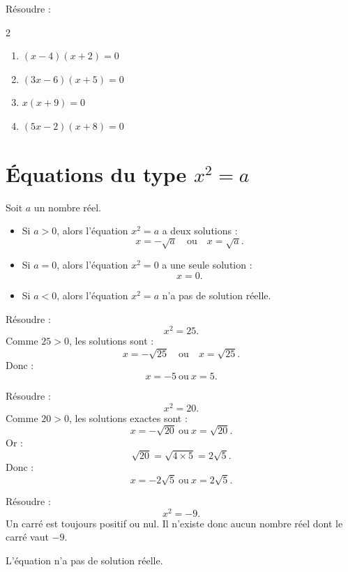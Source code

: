 \documentclass[11pt,a4paper]{article}
\newcounter{exercice}
\newcommand{\encadre}[1]{\boxed{\displaystyle #1}}
\begin{document}
\begin{exercice}
Résoudre :
\begin{multicols}{2}
\begin{enumerate}[label=\alph*)]
  \item $(x-4)(x+2)=0$
  \item $(3x-6)(x+5)=0$
  \item $x(x+9)=0$
  \item $(5x-2)(x+8)=0$
\end{enumerate}
\end{multicols}
\end{exercice}

\newpage

\section{Équations du type \texorpdfstring{$x^2=a$}{x2=a}}

\begin{propriete}
Soit $a$ un nombre réel.

\begin{itemize}
  \item Si $a>0$, alors l'équation $x^2=a$ a deux solutions :
  \[
  x=-\sqrt a
  \quad \text{ou} \quad
  x=\sqrt a.
  \]
  \item Si $a=0$, alors l'équation $x^2=0$ a une seule solution :
  \[
  x=0.
  \]
  \item Si $a<0$, alors l'équation $x^2=a$ n'a pas de solution réelle.
\end{itemize}
\end{propriete}

\begin{exemple}
Résoudre :
\[
x^2=25.
\]
Comme $25>0$, les solutions sont :
\[
x=-\sqrt{25}
\quad \text{ou} \quad
x=\sqrt{25}.
\]
Donc :
\[
\encadre{x=-5\ \text{ou}\ x=5}.
\]
\end{exemple}

\begin{exemple}
Résoudre :
\[
x^2=20.
\]
Comme $20>0$, les solutions exactes sont :
\[
\encadre{x=-\sqrt{20}\ \text{ou}\ x=\sqrt{20}}.
\]
Or :
\[
\sqrt{20}=\sqrt{4\times5}=2\sqrt5.
\]
Donc :
\[
\encadre{x=-2\sqrt5\ \text{ou}\ x=2\sqrt5}.
\]
\end{exemple}

\begin{exemple}
Résoudre :
\[
x^2=-9.
\]
Un carré est toujours positif ou nul. Il n'existe donc aucun nombre réel dont le carré vaut $-9$.

L'équation n'a pas de solution réelle.
\end{exemple}
\end{document}
